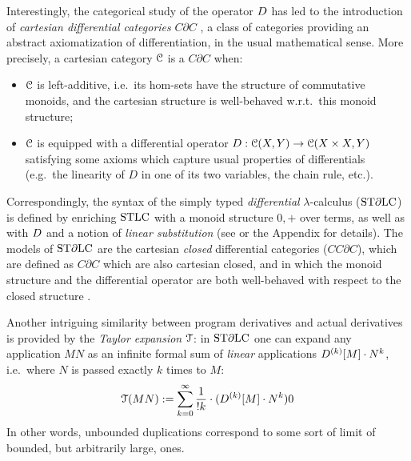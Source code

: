 Interestingly, the categorical study of the operator $\Der$ has led to the introduction of \emph{cartesian differential categories} $C\partial C$ \cite{Blute2009}, a class of categories providing an abstract axiomatization of differentiation, in the usual mathematical sense. More precisely, a cartesian category $\mathcal{C}$ is a $C\partial C$ when:
\begin{itemize}
\item $\mathcal{C}$ is left-additive, i.e.~its hom-sets have the structure of commutative monoids, and the cartesian structure is well-behaved w.r.t.~this monoid structure;
\item $\mathcal{C}$ is equipped with a differential operator $D:
\mathcal{C}(X,Y)\to \mathcal{C}(X\times X,Y)$ satisfying some axioms which capture usual properties of differentials (e.g.~the linearity of $D$ in one of its two variables, the chain rule, etc.).
\end{itemize}

Correspondingly, the syntax of the simply typed \emph{differential} $\lambda$-calculus ($\mathrm{ST}\partial\mathrm{LC}$) is defined by enriching $\mathrm{STLC}$ with a monoid structure $0,+$ over terms, as well as with $\Der$ and a notion of \emph{linear substitution} (see \cite{difflambda} or the Appendix for details).
The models of $\mathrm{ST}\partial\mathrm{LC}$ are the 
cartesian \emph{closed} differential categories ($CC\partial C$), 
which are defined as $C\partial C$ which are also cartesian closed, and in which the monoid structure and the differential operator are both well-behaved with respect to the closed structure \cite{Manzo2012}. 


Another intriguing similarity between program derivatives and 
actual derivatives is provided by the \emph{Taylor expansion} $\mathcal{T}$:
in $\mathrm{ST}\partial\mathrm{LC}$ one can expand any application $MN$ as an infinite formal sum of \emph{linear} applications
$\Der^{(k)}[M]\cdot N^{k}$, i.e.~where $N$ is passed exactly $k$ times to $M$:
\begin{align}\label{eq:taylor}
\Te{MN} :=  \sum_{k=0}^{\infty}\frac{1}{!k}\cdot (\Der^{(k)}[M] \cdot N^{k})0
\end{align}
In other words, unbounded duplications correspond to some sort of limit of bounded, but arbitrarily large, ones.%


